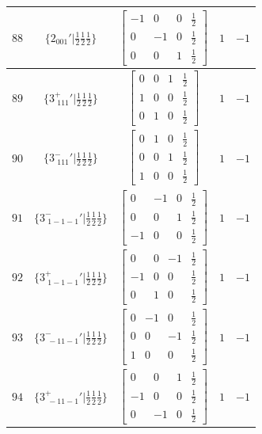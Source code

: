 \documentclass[fleqn,8pt]{jsarticle}
\begin{document}
\begin{longtable}{ccccc}
$ 88 $ & $ \{2{}_{001}{}'|\frac{1}{2} \frac{1}{2} \frac{1}{2}\} $ & $ \begin{bmatrix} -1 & 0 & 0 & \frac{1}{2} \\ 0 & -1 & 0 & \frac{1}{2} \\ 0 & 0 & 1 & \frac{1}{2} \end{bmatrix} $ & $ 1 $ & $ -1 $ \\ \hline
$ 89 $ & $ \{3^{+}_{\,\,111}{}'|\frac{1}{2} \frac{1}{2} \frac{1}{2}\} $ & $ \begin{bmatrix} 0 & 0 & 1 & \frac{1}{2} \\ 1 & 0 & 0 & \frac{1}{2} \\ 0 & 1 & 0 & \frac{1}{2} \end{bmatrix} $ & $ 1 $ & $ -1 $ \\ \hline
$ 90 $ & $ \{3^{-}_{\,\,111}{}'|\frac{1}{2} \frac{1}{2} \frac{1}{2}\} $ & $ \begin{bmatrix} 0 & 1 & 0 & \frac{1}{2} \\ 0 & 0 & 1 & \frac{1}{2} \\ 1 & 0 & 0 & \frac{1}{2} \end{bmatrix} $ & $ 1 $ & $ -1 $ \\ \hline
$ 91 $ & $ \{3^{-}_{\,\,1-1-1}{}'|\frac{1}{2} \frac{1}{2} \frac{1}{2}\} $ & $ \begin{bmatrix} 0 & -1 & 0 & \frac{1}{2} \\ 0 & 0 & 1 & \frac{1}{2} \\ -1 & 0 & 0 & \frac{1}{2} \end{bmatrix} $ & $ 1 $ & $ -1 $ \\ \hline
$ 92 $ & $ \{3^{+}_{\,\,1-1-1}{}'|\frac{1}{2} \frac{1}{2} \frac{1}{2}\} $ & $ \begin{bmatrix} 0 & 0 & -1 & \frac{1}{2} \\ -1 & 0 & 0 & \frac{1}{2} \\ 0 & 1 & 0 & \frac{1}{2} \end{bmatrix} $ & $ 1 $ & $ -1 $ \\ \hline
$ 93 $ & $ \{3^{-}_{\,\,-11-1}{}'|\frac{1}{2} \frac{1}{2} \frac{1}{2}\} $ & $ \begin{bmatrix} 0 & -1 & 0 & \frac{1}{2} \\ 0 & 0 & -1 & \frac{1}{2} \\ 1 & 0 & 0 & \frac{1}{2} \end{bmatrix} $ & $ 1 $ & $ -1 $ \\ \hline
$ 94 $ & $ \{3^{+}_{\,\,-11-1}{}'|\frac{1}{2} \frac{1}{2} \frac{1}{2}\} $ & $ \begin{bmatrix} 0 & 0 & 1 & \frac{1}{2} \\ -1 & 0 & 0 & \frac{1}{2} \\ 0 & -1 & 0 & \frac{1}{2} \end{bmatrix} $ & $ 1 $ & $ -1 $ \\ \hline

\end{longtable}
\end{document}
